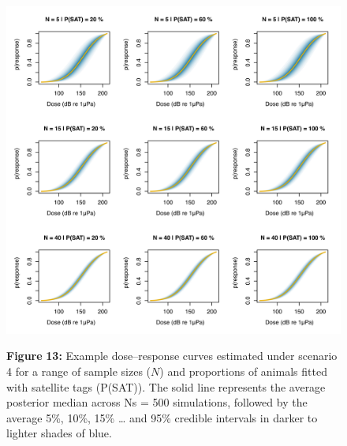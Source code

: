 \documentclass[
]{article}
\begin{document}
\begin{figure}

{\centering \includegraphics[width=1\linewidth]{fig/fig_doseresponse_S4} 

}

\textbf{Figure }{\textbf{13:} \hypertarget{fig13}{}Example dose--response curves estimated under scenario 4 for a range of sample sizes (\(N\)) and proportions of animals fitted with satellite tags (P(SAT)). The solid line represents the average posterior median across Ns = 500 simulations, followed by the average 5\%, 10\%, 15\% \ldots{} and 95\% credible intervals in darker to lighter shades of blue.}\label{fig:unnamed-chunk-12}
\end{figure}
\end{document}
